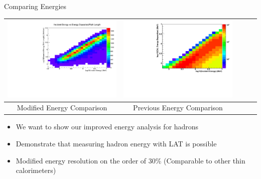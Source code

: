 \documentclass[10pt, table]{beamer}
\begin{document}

\begin{frame}{Comparing Energies}

\begin{center}
  \begin{tabular}{|c|c|c|cl} \hline
           \includegraphics[width = 0.5 \columnwidth]{CalEnergyRaw-CalFullLen_mom12}
 &           \includegraphics[width = 0.5 \columnwidth]{CalEnergyRaw} \\ \hline
  Modified Energy Comparison & Previous Energy Comparison\\ \hline
  \end{tabular}
  \begin{itemize}
\item We want to show our improved energy analysis for hadrons
\item Demonstrate that measuring hadron energy with LAT is possible
\item Modified energy resolution on the order of 30\% (Comparable to other thin calorimeters)
\end{itemize}
\end{center}

\end{frame}

\end{document}
